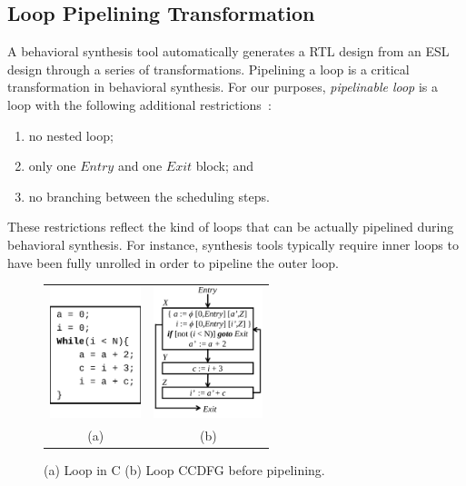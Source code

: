 \subsection{Loop Pipelining Transformation}
\label{subsec:loop-pipelining-trans}
A behavioral synthesis tool automatically generates a RTL design from an ESL design through a series of
transformations. Pipelining a loop is a critical
transformation in behavioral synthesis. For our purposes,
{\em pipelinable loop} is a loop with the following additional restrictions~\cite{hrx:dac-12}:
\begin{enumerate}
\item no nested loop;
\item only one $Entry$ and one $Exit$ block; and
\item no branching between the scheduling steps.
\end{enumerate}
These restrictions reflect the kind of loops that can be
actually pipelined during behavioral synthesis. For
instance, synthesis tools typically require inner loops to
have been fully unrolled  in order to pipeline the outer loop.


\begin{figure}[H]%
\begin{center}
\begin{tabular}{cc}
\includegraphics[height=1.5in]{fig-rpe/C-code}
& \hspace{2cm}
\includegraphics[height=1.5in]{fig-rpe/seq-ccdfg}
\\
(a) & \hspace{2cm} (b) 
\end{tabular}
\end{center}
\caption{(a) Loop in C (b) Loop CCDFG before pipelining.}
\label{fig:high-level-synthesis}
\end{figure}

